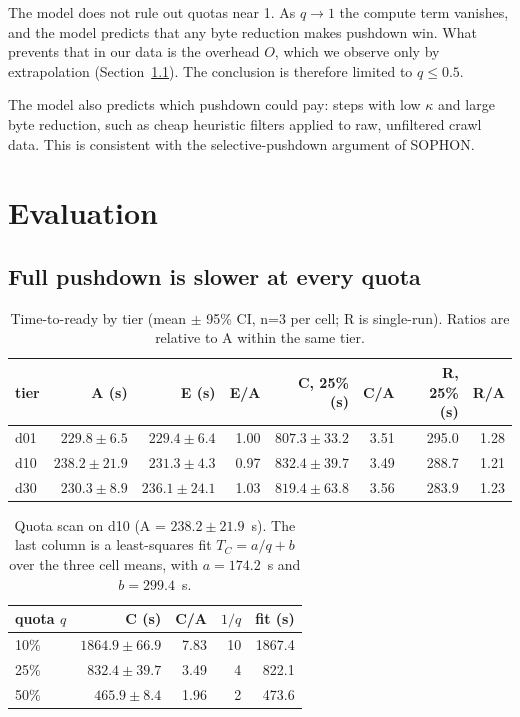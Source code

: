 \documentclass[11pt]{article}
\begin{document}
The model does not rule out quotas near 1. As $q \to 1$ the compute term vanishes, and the model predicts that any byte reduction makes pushdown win. What prevents that in our data is the overhead $O$, which we observe only by extrapolation (Section~\ref{sec:full}). The conclusion is therefore limited to $q \le 0.5$.

The model also predicts which pushdown could pay: steps with low $\kappa$ and large byte reduction, such as cheap heuristic filters applied to raw, unfiltered crawl data. This is consistent with the selective-pushdown argument of SOPHON.

\section{Evaluation}

\subsection{Full pushdown is slower at every quota}
\label{sec:full}

\begin{table}[t]
\centering
\caption{Time-to-ready by tier (mean $\pm$ 95\% CI, n=3 per cell; R is single-run). Ratios are relative to A within the same tier.}
\label{tab:tier}
\begin{tabular}{lrrrrrrr}
\toprule
tier & A (s) & E (s) & E/A & C, 25\% (s) & C/A & R, 25\% (s) & R/A \\
\midrule
d01 & $229.8 \pm 6.5$ & $229.4 \pm 6.4$ & 1.00 & $807.3 \pm 33.2$ & 3.51 & 295.0 & 1.28 \\
d10 & $238.2 \pm 21.9$ & $231.3 \pm 4.3$ & 0.97 & $832.4 \pm 39.7$ & 3.49 & 288.7 & 1.21 \\
d30 & $230.3 \pm 8.9$ & $236.1 \pm 24.1$ & 1.03 & $819.4 \pm 63.8$ & 3.56 & 283.9 & 1.23 \\
\bottomrule
\end{tabular}
\end{table}

\begin{table}[t]
\centering
\caption{Quota scan on d10 (A = $238.2 \pm 21.9$~s). The last column is a least-squares fit $T_C = a/q + b$ over the three cell means, with $a = 174.2$~s and $b = 299.4$~s.}
\label{tab:quota}
\begin{tabular}{lrrrr}
\toprule
quota $q$ & C (s) & C/A & $1/q$ & fit (s) \\
\midrule
10\% & $1864.9 \pm 66.9$ & 7.83 & 10 & 1867.4 \\
25\% & $832.4 \pm 39.7$ & 3.49 & 4 & 822.1 \\
50\% & $465.9 \pm 8.4$ & 1.96 & 2 & 473.6 \\
\bottomrule
\end{tabular}
\end{table}
\end{document}
